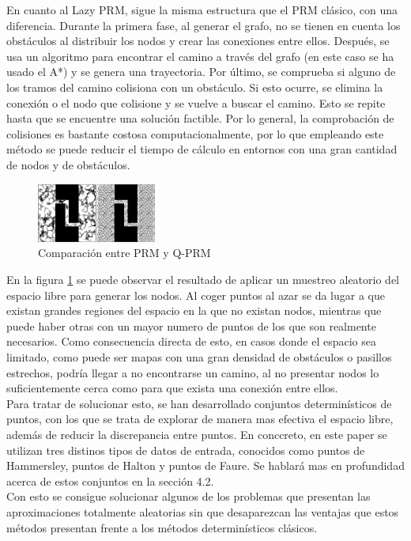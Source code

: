 En cuanto al Lazy PRM, sigue la misma estructura que el PRM clásico, con una diferencia. Durante la primera fase, al generar el grafo, no se tienen en cuenta los obstáculos al distribuir los nodos y crear las conexiones entre ellos. Después, se usa un algoritmo para encontrar el camino a través del grafo (en este caso se ha usado el A*) y se genera una trayectoria. Por último, se comprueba si alguno de los tramos del camino colisiona con un obstáculo. Si esto ocurre, se elimina la conexión o el nodo que colisione y se vuelve a buscar el camino. Esto se repite hasta que se encuentre una solución factible. Por lo general, la comprobación de colisiones es bastante costosa computacionalmente, por lo que empleando este método se puede reducir el tiempo de cálculo en entornos con una gran cantidad de nodos y de obstáculos.  
\\

\begin{figure}[h]
		\centering
        \includegraphics[width=0.35\textwidth]{images/PRM_y_Q-PRM.png}
        \caption{Comparación entre PRM y Q-PRM}
        \label{fig:comparacion_algoritmos}
\end{figure} 

En la figura \ref{fig:comparacion_algoritmos} se puede observar el resultado de aplicar un muestreo aleatorio del espacio libre para generar los nodos. Al coger puntos al azar se da lugar a que existan grandes regiones del espacio en la que no existan nodos, mientras que puede haber otras con un mayor numero de puntos de los que son realmente necesarios. Como consecuencia directa de esto, en casos donde el espacio sea limitado, como puede ser mapas con una gran densidad de obstáculos o pasillos estrechos, podría llegar a no encontrarse un camino, al no presentar nodos lo suficientemente cerca como para que exista una conexión entre ellos.
\\

Para tratar de solucionar esto, se han desarrollado conjuntos determinísticos de puntos, con los que se trata de explorar de manera mas efectiva el espacio libre, además de reducir la discrepancia entre puntos. En conccreto, en este paper se utilizan tres distinos tipos de datos de entrada, conocidos como puntos de Hammersley, puntos de Halton y puntos de Faure. Se hablará mas en profundidad acerca de estos conjuntos en la sección 4.2.
\\

Con esto se consigue solucionar algunos de los problemas que presentan las aproximaciones totalmente aleatorias sin que desaparezcan las ventajas que estos métodos presentan frente a los métodos determinísticos clásicos.
\\
\\